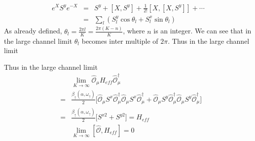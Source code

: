 \documentclass[reprint,prb,superscriptaddress]{revtex4-1}
\begin{document}
\begin{eqnarray}
e^X S^y e^{-X}&=& S^y+[X,S^y] + \frac{1}{2!}[X,[X,S^y]] +\cdots  \nonumber\\
&=& \sum_l  (S^y_l \cos\theta_l  + S^x_l \sin\theta_l)
\end{eqnarray}
As already defined, $\theta_l=\frac{2\pi l}{K}=\frac{2\pi (K-n)}{K}$, where $n$ is an integer. We can see that in the large channel limit $\theta_l $ becomes inter multiple of $2\pi$. Thus in the large channel limit



Thus in the large channel limit
\begin{eqnarray}
&& \lim_{K\rightarrow \infty}\hat{\mathcal{O}}_{\mu} H_{eff} \hat{\mathcal{O}}_{\mu}^{\dagger}\nonumber\\
 &=& \frac{\beta_{\uparrow}(\alpha,\omega_{\uparrow})}{2} \bigg[ \hat{\mathcal{O}}_{\mu} S^x \hat{\mathcal{O}}_{\mu}^{\dagger} \hat{\mathcal{O}}_{\mu} S^x \hat{\mathcal{O}}_{\mu}^{\dagger}  + \hat{\mathcal{O}}_{\mu} S^y \hat{\mathcal{O}}_{\mu}^{\dagger} \hat{\mathcal{O}}_{\mu} S^y \hat{\mathcal{O}}_{\mu}^{\dagger}  \bigg]\nonumber\\
&=&\frac{\beta_{\uparrow}(\alpha,\omega_{\uparrow})}{2} \bigg[  S^{x2}+S^{y2}  \bigg] = H_{eff} \nonumber\\
&&\lim_{K\rightarrow \infty } [\hat{\mathcal{O}},H_{eff}] = 0
\label{eq:hamiltonian_twisted}
\end{eqnarray}
 
\end{document}
